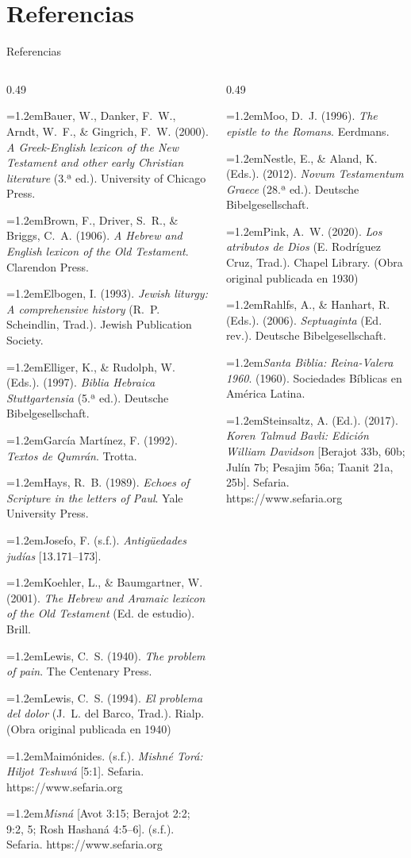 \documentclass[hyperref={bookmarks=false},aspectratio=169]{beamer}
\newcommand{\refapa}[1]{\par{\RaggedRight\hangindent=1.2em\hangafter=1\noindent #1\par}\vspace{3pt}}
\begin{document}
\section{Referencias}

\begin{frame}{Referencias}
\fontsize{5.2}{6.2}\selectfont
\begin{columns}[t,onlytextwidth]
\begin{column}{0.49\textwidth}
\refapa{Bauer, W., Danker, F.~W., Arndt, W.~F., \& Gingrich, F.~W. (2000). \emph{A Greek-English lexicon of the New Testament and other early Christian literature} (3.ª ed.). University of Chicago Press.}
\refapa{Brown, F., Driver, S.~R., \& Briggs, C.~A. (1906). \emph{A Hebrew and English lexicon of the Old Testament}. Clarendon Press.}
\refapa{Elbogen, I. (1993). \emph{Jewish liturgy: A comprehensive history} (R.~P. Scheindlin, Trad.). Jewish Publication Society.}
\refapa{Elliger, K., \& Rudolph, W. (Eds.). (1997). \emph{Biblia Hebraica Stuttgartensia} (5.ª ed.). Deutsche Bibelgesellschaft.}
\refapa{García Martínez, F. (1992). \emph{Textos de Qumrán}. Trotta.}
\refapa{Hays, R.~B. (1989). \emph{Echoes of Scripture in the letters of Paul}. Yale University Press.}
\refapa{Josefo, F. (s.f.). \emph{Antigüedades judías} [13.171--173].}
\refapa{Koehler, L., \& Baumgartner, W. (2001). \emph{The Hebrew and Aramaic lexicon of the Old Testament} (Ed. de estudio). Brill.}
\refapa{Lewis, C.~S. (1940). \emph{The problem of pain}. The Centenary Press.}
\refapa{Lewis, C.~S. (1994). \emph{El problema del dolor} (J.~L. del Barco, Trad.). Rialp. (Obra original publicada en 1940)}
\refapa{Maimónides. (s.f.). \emph{Mishné Torá: Hiljot Teshuvá} [5:1]. Sefaria. https://www.sefaria.org}
\refapa{\emph{Misná} [Avot 3:15; Berajot 2:2; 9:2, 5; Rosh Hashaná 4:5--6]. (s.f.). Sefaria. https://www.sefaria.org}
\end{column}
\begin{column}{0.49\textwidth}
\refapa{Moo, D.~J. (1996). \emph{The epistle to the Romans}. Eerdmans.}
\refapa{Nestle, E., \& Aland, K. (Eds.). (2012). \emph{Novum Testamentum Graece} (28.ª ed.). Deutsche Bibelgesellschaft.}
\refapa{Pink, A.~W. (2020). \emph{Los atributos de Dios} (E. Rodríguez Cruz, Trad.). Chapel Library. (Obra original publicada en 1930)}
\refapa{Rahlfs, A., \& Hanhart, R. (Eds.). (2006). \emph{Septuaginta} (Ed. rev.). Deutsche Bibelgesellschaft.}
\refapa{\emph{Santa Biblia: Reina-Valera 1960}. (1960). Sociedades Bíblicas en América Latina.}
\refapa{Steinsaltz, A. (Ed.). (2017). \emph{Koren Talmud Bavli: Edición William Davidson} [Berajot 33b, 60b; Julín 7b; Pesajim 56a; Taanit 21a, 25b]. Sefaria. https://www.sefaria.org}

\end{column}
\end{columns}
\end{frame}
\end{document}
